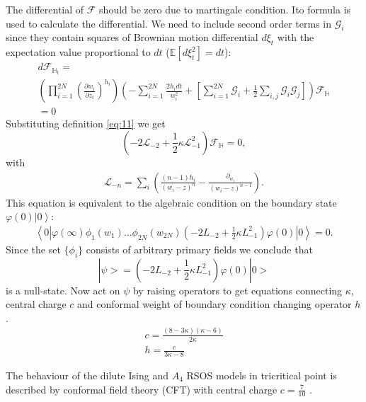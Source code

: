\documentclass[12pt]{article}
\begin{document}
\begin{itemize}
The differential of $\mathcal{F}$ should be zero due to martingale condition.  Ito formula is used to calculate the differential. We need to include second order terms in  $\mathcal{G}_{i}$ since they contain squares of Brownian motion differential $d\xi_{t}$ with the expectation value proportional to $dt$ ($\mathbb{E}[d\xi_{t}^{2}]=dt$):
\begin{multline}
d \mathcal{F}_{\mathbb{H}_{t}}=\\ \left(\prod_{i=1}^{2N}\left(\frac{\partial w_{i}}{\partial z_{i}}\right)^{h_{i}}\right)
\left(-\sum_{i=1}^{2N}\frac{2h_{i}dt}{w_{i}^{2}}+\left[\sum_{i=1}^{2N}\mathcal{G}_{i}+\frac{1}{2}
      \sum_{i,j}\mathcal{G}_{i}\mathcal{G}_{j}\right]\right)\mathcal{F}_{\mathbb{H}}\\=0
\label{eq:8}
\end{multline}
Substituting  definition \eqref{eq:11} we get 
\begin{equation}
  \left(-2 \mathcal{L}_{-2}+\frac{1}{2}\kappa \mathcal{L}_{-1}^{2}\right)        \mathcal{F}_{\mathbb{H}}=0,
  \label{eq:4}
\end{equation}
with
\begin{eqnarray*}
  \mathcal{L}_{-n}=\sum_{i}\left(\frac{(n-1)h_{i}}{(w_{i}-z)^{n}}-\frac{\partial_{w_{i}}}{(w_{i}-z)^{n-1}}\right).
\end{eqnarray*}
This equation is equivalent to the algebraic condition on the boundary state $\varphi(0)\left|0\right>$:
\begin{multline}
  \label{eq:7}
  \left<0\left|\varphi(\infty)\phi_{1}(w_{1})\dots\phi_{2N}(w_{2N})
  \left(-2L_{-2}+\frac{1}{2}\kappa L_{-1}^{2}\right)
\varphi(0)\right|0\right>=0.
\end{multline}
Since the set $\{\phi_{i}\}$ consists of arbitrary primary fields we conclude that 
\begin{equation}
|\psi>=\left(-2L_{-2}+\frac{1}{2}\kappa L_{-1}^{2}\right)
\varphi(0)|0>
\end{equation}
is a null-state. Now act on $\psi$ by raising operators to get
equations connecting  $\kappa$, central charge $c$ and conformal
weight of boundary condition changing operator $h$.
\begin{eqnarray}
  \label{eq:15}
  c=\frac{(8-3\kappa)(\kappa-6)}{2\kappa}\\
  h=\frac{c}{3\kappa-8}
\end{eqnarray}


The behaviour of the dilute Ising and $A_4$ RSOS  models in tricritical
point is described by conformal field theory (CFT) with central charge $c=\frac{7}{10}$
\cite{friedan1985superconformal}. 


\end{itemize}
\end{document}
